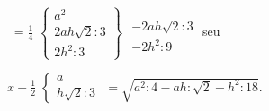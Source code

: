 \rule[-4mm]{0pt}{12mm}%
$\;=\displaystyle\frac{1}{4}$%
{$\left \{\begin{array}{l} a^2 \\ 2ah\sqrt2 :3 \\2h^2:3 \end{array} \right \}$}%
$\begin{array}{l} \\ -2ah\sqrt2 :3 \\ -2h^2:9 \end{array}$
seu
\pend
\pstart
\noindent
 \rule[-4mm]{0pt}{12mm}%
 $x-\displaystyle\frac{1}{2}$%
 {$ \left \{\begin{array}{l} a \\ h\sqrt2 :3 \end{array} \right.$}%
 $ = \sqrt{a^2:4-ah:\sqrt2 -h^2:18}$. 
\pend
